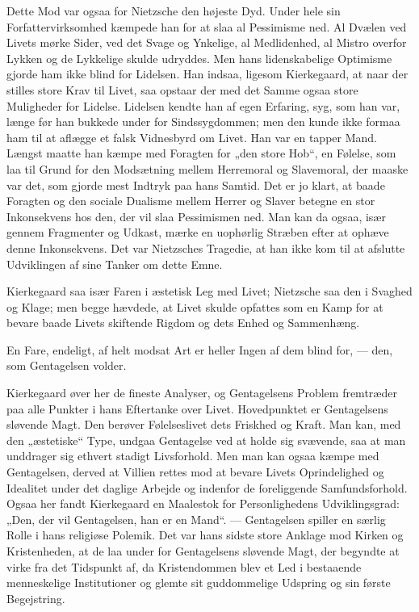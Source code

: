 \documentclass[12pt,a4paper,openany]{book}
\newcommand{\opage}[1]{\marginnote{\footnotesize\textit{[#1]}}}
\begin{document}
Dette Mod var ogsaa for Nietzsche den højeste Dyd. Under
hele sin Forfattervirksomhed kæmpede han for at slaa al Pessimisme
ned. Al Dvælen ved Livets mørke Sider, ved det
Svage og Ynkelige, al Medlidenhed, al Mistro overfor Lykken
og de Lykkelige skulde udryddes. Men hans lidenskabelige
Optimisme gjorde ham ikke blind for Lidelsen. Han indsaa,
ligesom Kierkegaard, at naar der stilles store Krav til Livet,
saa opstaar der med det Samme ogsaa store Muligheder for
Lidelse. Lidelsen kendte han af egen Erfaring, syg, som han
var, længe før han bukkede under for Sindssygdommen; men
den kunde ikke formaa ham til at aflægge et falsk Vidnesbyrd
om Livet. Han var en tapper Mand. Længst maatte han kæmpe
\setcounter{footnote}{0}%
\opage{193}med Foragten for „den store Hob“, en Følelse, som laa til
Grund for den Modsætning mellem Herremoral og Slavemoral,
der maaske var det, som gjorde mest Indtryk paa hans Samtid.
Det er jo klart, at baade Foragten og den sociale Dualisme
mellem Herrer og Slaver betegne en stor Inkonsekvens hos
den, der vil slaa Pessimismen ned. Man kan da ogsaa, især
gennem Fragmenter og Udkast, mærke en uophørlig Stræben
efter at ophæve denne Inkonsekvens. Det var Nietzsches
Tragedie, at han ikke kom til at afslutte Udviklingen af sine
Tanker om dette Emne.

Kierkegaard saa især Faren i æstetisk Leg med Livet;
Nietzsche saa den i Svaghed og Klage; men begge hævdede,
at Livet skulde opfattes som en Kamp for at bevare baade
Livets skiftende Rigdom og dets Enhed og Sammenhæng.

En Fare, endeligt, af helt modsat Art er heller Ingen af
dem blind for, --- den, som Gentagelsen volder.

Kierkegaard øver her de fineste Analyser, og Gentagelsens
Problem fremtræder paa alle Punkter i hans Eftertanke over
Livet. Hovedpunktet er Gentagelsens sløvende Magt. Den
berøver Følelseslivet dets Friskhed og Kraft. Man kan, med
den „æstetiske“ Type, undgaa Gentagelse ved at holde sig
svævende, saa at man unddrager sig ethvert stadigt Livsforhold.
Men man kan ogsaa kæmpe med Gentagelsen, derved
at Villien rettes mod at bevare Livets Oprindelighed og Idealitet
under det daglige Arbejde og indenfor de foreliggende
Samfundsforhold. Ogsaa her fandt Kierkegaard en Maalestok
for Personlighedens Udviklingsgrad: „Den, der vil Gentagelsen,
han er en Mand“. --- Gentagelsen spiller en særlig Rolle i
hans religiøse Polemik. Det var hans sidste store Anklage
mod Kirken og Kristenheden, at de laa under for Gentagelsens
sløvende Magt, der begyndte at virke fra det Tidspunkt af, da
Kristendommen blev et Led i bestaaende menneskelige Institutioner
og glemte sit guddommelige Udspring og sin første Begejstring.
\end{document}
